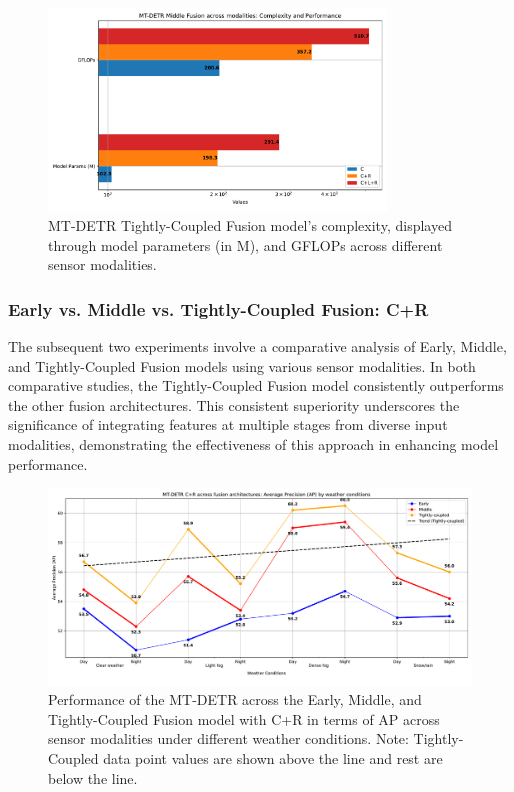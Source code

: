 \documentclass[report.tex]{subfiles}
\begin{document}
    \begin{figure}[h!]
        \centering
        \includegraphics[width=0.8\textwidth]{images/results/mtdetr/tight/model_complexity.pdf}
        \caption{MT-DETR Tightly-Coupled Fusion model's complexity, displayed through model parameters (in M), and GFLOPs across different sensor modalities.}
        \label{fig:mtdetr_tight_model_complexity}
    \end{figure}


    

    \FloatBarrier
    \subsubsection{Early vs. Middle vs. Tightly-Coupled Fusion: C+R}

    The subsequent two experiments involve a comparative analysis of Early, Middle, and Tightly-Coupled Fusion models using various sensor modalities. In both comparative studies, the Tightly-Coupled Fusion model consistently outperforms the other fusion architectures. This consistent superiority underscores the significance of integrating features at multiple stages from diverse input modalities, demonstrating the effectiveness of this approach in enhancing model performance. 

    \begin{figure}[h!]
        \centering
        \includegraphics[width=1.0\textwidth]{images/results/mtdetr/EMT_CR/ap.pdf}
        \caption{Performance of the MT-DETR across the Early, Middle, and Tightly-Coupled Fusion model with C+R in terms of AP across sensor modalities under different weather conditions. Note: Tightly-Coupled data point values are shown above the line and rest are below the line.}
        \label{fig:mtdetr_emt_cr_ap}
    \end{figure}
\end{document}

